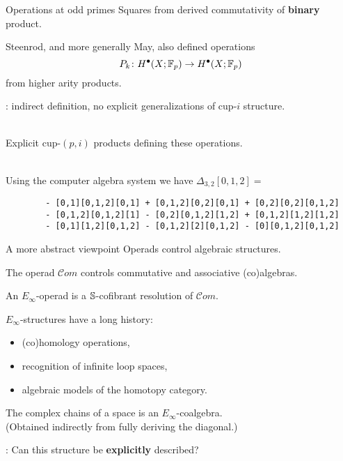 
\begin{frame}[fragile]{Operations at odd primes}
	\pause
	Squares from derived commutativity of \textbf{binary} product.

	\medskip\pause
	Steenrod, and more generally May, also defined operations
	\[
	P_k \colon H^\bullet(X; {\mathbb{F}_p}) \to H^\bullet(X; {\mathbb{F}_p})
	\]
	from higher arity products.

	\medskip\pause
	: indirect definition, no explicit generalizations of cup-$i$ structure.

	\bigskip\pause
	 \\
	Explicit cup-$(p,i)$ products defining these operations.

	\medskip\pause
	 \\
	Using the computer algebra system  we have $\Delta_{3,2}[0,1,2] = $

	\begin{verbatim}
		- [0,1][0,1,2][0,1] + [0,1,2][0,2][0,1] + [0,2][0,2][0,1,2]
		- [0,1,2][0,1,2][1] - [0,2][0,1,2][1,2] + [0,1,2][1,2][1,2]
		- [0,1][1,2][0,1,2] - [0,1,2][2][0,1,2] - [0][0,1,2][0,1,2]
	\end{verbatim}
\end{frame}

\begin{frame}{A more abstract viewpoint}
	\pause
	Operads control algebraic structures.

	\bigskip\pause
	The operad $\mathcal{C}om$ controls commutative and associative (co)algebras.

	\bigskip\pause
	An $E_\infty$-operad is a $\mathbb{S}$-cofibrant resolution of $\mathcal{C}om$.

	\bigskip\pause
	$E_\infty$-structures have a long history:
	\smallskip\pause
	\begin{itemize}
		\item (co)homology operations,
		\item recognition of infinite loop spaces,
		\item algebraic models of the homotopy category.
	\end{itemize}

	\bigskip\pause
	The complex chains of a space is an $E_\infty$-coalgebra. \\
	(Obtained indirectly from fully deriving the diagonal.)

	\bigskip\pause
	: Can this structure be \textbf{explicitly} described?
\end{frame}

